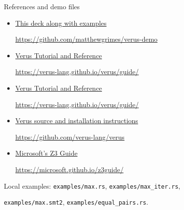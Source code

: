 \begin{frame}{References and demo files}
\small
\begin{itemize}
\item \href{https://github.com/matthewgrimes/verus-demo}{This deck along with examples}\par\scriptsize\url{https://github.com/matthewgrimes/verus-demo}\small
\item \href{https://verus-lang.github.io/verus/guide/}{Verus Tutorial and Reference}\par\scriptsize\url{https://verus-lang.github.io/verus/guide/}\small
\item \href{https://verus-lang.github.io/verus/guide/}{Verus Tutorial and Reference}\par\scriptsize\url{https://verus-lang.github.io/verus/guide/}\small
\item \href{https://github.com/verus-lang/verus}{Verus source and installation instructions}\par\scriptsize\url{https://github.com/verus-lang/verus}\small
\item \href{https://microsoft.github.io/z3guide/}{Microsoft's Z3 Guide}\par\scriptsize\url{https://microsoft.github.io/z3guide/}\small
\end{itemize}
\medskip
Local examples: \texttt{examples/max.rs}, \texttt{examples/max\_iter.rs},\par
\texttt{examples/max.smt2}, \texttt{examples/equal\_pairs.rs}.
\end{frame}
